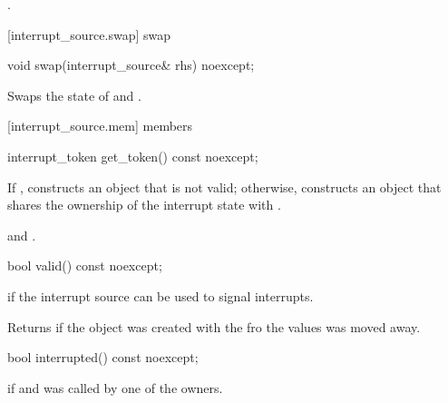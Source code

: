 {\begin{itemdescr}
  \pnum\returns {}.
\end{itemdescr}

[interrupt_source.swap]{ swap}

%
\begin{itemdecl}
void swap(interrupt_source& rhs) noexcept;
\end{itemdecl}

\begin{itemdescr}
 \pnum \effects Swaps the state of  and .
\end{itemdescr}


[interrupt_source.mem]{ members}

%
\begin{itemdecl}
interrupt_token get_token() const noexcept;
\end{itemdecl}
\begin{itemdescr}
  \pnum\effects If , constructs an  object
                that is not valid;
                otherwise, constructs an  object 
                that shares the ownership of the interrupt state with .

  \pnum\postconditions {}
                and .
\end{itemdescr}


%
\begin{itemdecl}
bool valid() const noexcept;
\end{itemdecl}
\begin{itemdescr}
  \pnum\returns {} if the interrupt source can be used to signal interrupts.
                \begin{note} Returns  if the object was created with the 
                             fro the values was moved away.
                             \end{note}
\end{itemdescr}

%
\begin{itemdecl}
bool interrupted() const noexcept;
\end{itemdecl}
\begin{itemdescr}
  \pnum\returns {} if  
                and  was called by one of the owners.
\end{itemdescr}

}
